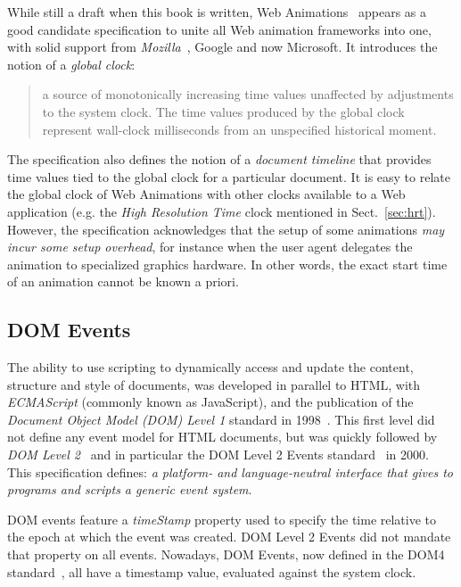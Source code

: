 While still a draft when this book is written, Web Animations~\cite{webanimation} appears as
a good candidate specification to unite all Web animation frameworks into one,
with solid support from \emph{Mozilla}~\cite{mozilla}, Google and now Microsoft. It introduces the
notion of a \emph{global clock}:
\begin{quote} a source of monotonically increasing time values unaffected by
adjustments to the system clock. The time values produced by the global clock
represent wall-clock milliseconds from an unspecified historical moment.
\end{quote}
The specification also defines the notion of a \emph{document timeline}
that provides time values tied to the global clock for a particular document.
It is easy to relate the global clock of Web Animations with other clocks
available to a Web application (e.g. the \emph{High Resolution Time} clock mentioned
in Sect.~\ref{sec:hrt}). However, the specification acknowledges that the setup of some
animations \emph{may incur some setup overhead}, for instance when the user agent
delegates the animation to specialized graphics hardware. In other words, the
exact start time of an animation cannot be known a priori.



\subsection{DOM Events}
\label{sec:domevents}

The ability to use scripting to dynamically access and update the content,
structure and style of documents, was developed in parallel to HTML, with
\emph{ECMAScript} (commonly known as JavaScript), and the publication of the
\emph{Document Object Model (DOM) Level 1} standard in 1998~\cite{dom1}. This
first level did not define any event model for HTML documents, but was quickly
followed by \emph{DOM Level 2}~\cite{dom2} and in particular the DOM Level 2
Events standard~\cite{domevents} in 2000. This specification defines: \emph{a
platform- and language-neutral interface that gives to programs and scripts a
generic event system}.

DOM events feature a \emph{timeStamp} property used to specify the time relative to
the epoch at which the event was created. DOM Level 2 Events did not mandate
that property on all events. Nowadays, DOM Events, now defined in the DOM4
standard~\cite{dom4}, all have a timestamp value, evaluated against the system
clock.

